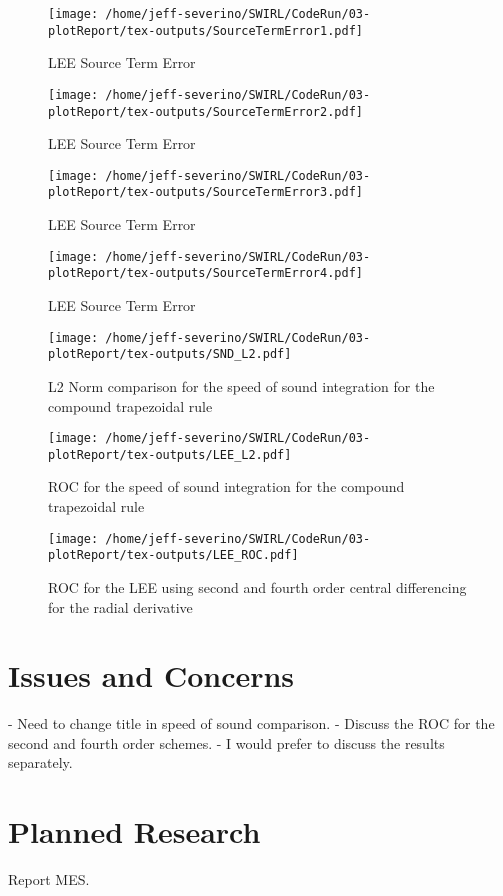 \documentclass[a4paper]{article}
\begin{document}
\begin{figure}[!]
    \centering
    \texttt{[image: /home/jeff-severino/SWIRL/CodeRun/03-plotReport/tex-outputs/SourceTermError1.pdf]}
    \caption{LEE Source Term Error}
    \label{fig:7}
\end{figure}


\begin{figure}[!]
    \centering
    \texttt{[image: /home/jeff-severino/SWIRL/CodeRun/03-plotReport/tex-outputs/SourceTermError2.pdf]}
    \caption{LEE Source Term Error}
    \label{fig:7}
\end{figure}


\begin{figure}[!]
    \centering
    \texttt{[image: /home/jeff-severino/SWIRL/CodeRun/03-plotReport/tex-outputs/SourceTermError3.pdf]}
    \caption{LEE Source Term Error}
    \label{fig:7}
\end{figure}


\begin{figure}[!]
    \centering
    \texttt{[image: /home/jeff-severino/SWIRL/CodeRun/03-plotReport/tex-outputs/SourceTermError4.pdf]}
    \caption{LEE Source Term Error}
    \label{fig:7}
\end{figure}

\begin{figure}[!]
    \centering
    \texttt{[image: /home/jeff-severino/SWIRL/CodeRun/03-plotReport/tex-outputs/SND\_L2.pdf]}
    \caption{L2 Norm comparison for the speed of sound integration for the compound trapezoidal rule}
    \label{fig:8}
\end{figure}



\begin{figure}[!]
    \centering
    \texttt{[image: /home/jeff-severino/SWIRL/CodeRun/03-plotReport/tex-outputs/LEE\_L2.pdf]}
    \caption{ROC  for the speed of sound integration for the compound trapezoidal rule}
    \label{fig:9}
\end{figure}


\begin{figure}[!]
    \centering
        \texttt{[image: /home/jeff-severino/SWIRL/CodeRun/03-plotReport/tex-outputs/LEE\_ROC.pdf]}
       \caption{ROC for the LEE using second and fourth order central differencing
       for the radial derivative}
        \label{fig:10}
\end{figure}





\section{Issues and Concerns}
- Need to change title in speed of sound comparison.
- Discuss the ROC for the second and fourth order schemes. 
- I would prefer to discuss the results separately.
\section{Planned Research}
Report MES. 
\end{document}
